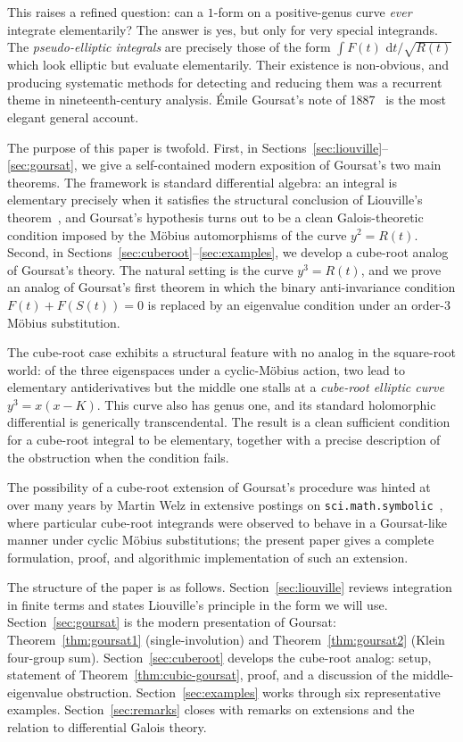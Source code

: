 \documentclass[11pt,a4paper]{article}
\theoremstyle{plain}
\theoremstyle{definition}
\theoremstyle{remark}
\renewcommand{\d}{\,\mathrm{d}}
\begin{document}
This raises a refined question: can a $1$-form on a positive-genus curve \emph{ever} integrate elementarily? The answer is yes, but only for very special integrands. The \emph{pseudo-elliptic integrals} are precisely those of the form $\int F(t)\,\d t/\sqrt{R(t)}$ which look elliptic but evaluate elementarily. Their existence is non-obvious, and producing systematic methods for detecting and reducing them was a recurrent theme in nineteenth-century analysis. \'Emile Goursat's note of 1887~\cite{Goursat1887} is the most elegant general account.

The purpose of this paper is twofold. First, in Sections~\ref{sec:liouville}--\ref{sec:goursat}, we give a self-contained modern exposition of Goursat's two main theorems. The framework is standard differential algebra: an integral is elementary precisely when it satisfies the structural conclusion of Liouville's theorem~\cite{Rosenlicht1972}, and Goursat's hypothesis turns out to be a clean Galois-theoretic condition imposed by the M\"obius automorphisms of the curve $y^2 = R(t)$. Second, in Sections~\ref{sec:cuberoot}--\ref{sec:examples}, we develop a cube-root analog of Goursat's theory. The natural setting is the curve $y^3 = R(t)$, and we prove an analog of Goursat's first theorem in which the binary anti-invariance condition $F(t)+F(S(t))=0$ is replaced by an eigenvalue condition under an order-$3$ M\"obius substitution.

The cube-root case exhibits a structural feature with no analog in the square-root world: of the three eigenspaces under a cyclic-Möbius action, two lead to elementary antiderivatives but the middle one stalls at a \emph{cube-root elliptic curve} $y^3=x(x-K)$. This curve also has genus one, and its standard holomorphic differential is generically transcendental. The result is a clean sufficient condition for a cube-root integral to be elementary, together with a precise description of the obstruction when the condition fails.

The possibility of a cube-root extension of Goursat's procedure was hinted at over many years by Martin Welz in extensive postings on \texttt{sci.math.symbolic}~\cite{WelzNewsgroup}, where particular cube-root integrands were observed to behave in a Goursat-like manner under cyclic M\"obius substitutions; the present paper gives a complete formulation, proof, and algorithmic implementation of such an extension.

\medskip

The structure of the paper is as follows. Section~\ref{sec:liouville} reviews integration in finite terms and states Liouville's principle in the form we will use. Section~\ref{sec:goursat} is the modern presentation of Goursat: Theorem~\ref{thm:goursat1} (single-involution) and Theorem~\ref{thm:goursat2} (Klein four-group sum). Section~\ref{sec:cuberoot} develops the cube-root analog: setup, statement of Theorem~\ref{thm:cubic-goursat}, proof, and a discussion of the middle-eigenvalue obstruction. Section~\ref{sec:examples} works through six representative examples. Section~\ref{sec:remarks} closes with remarks on extensions and the relation to differential Galois theory.
\end{document}
